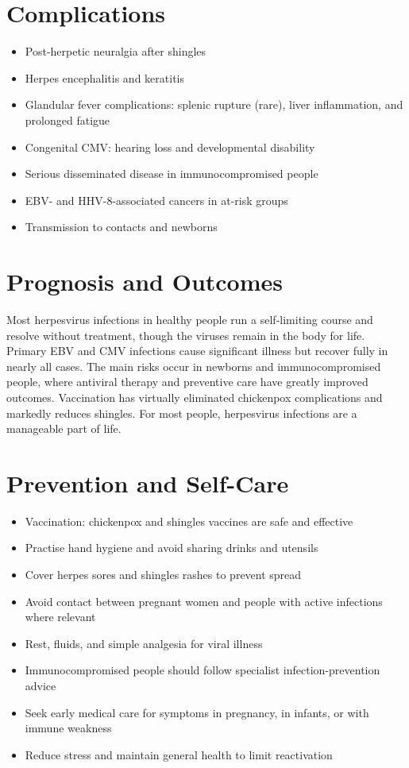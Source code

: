\section*{Complications}
\begin{itemize}
    \item Post-herpetic neuralgia after shingles
    \item Herpes encephalitis and keratitis
    \item Glandular fever complications: splenic rupture (rare), liver inflammation, and prolonged fatigue
    \item Congenital CMV: hearing loss and developmental disability
    \item Serious disseminated disease in immunocompromised people
    \item EBV- and HHV-8-associated cancers in at-risk groups
    \item Transmission to contacts and newborns
\end{itemize}

\section*{Prognosis and Outcomes}
Most herpesvirus infections in healthy people run a self-limiting course and resolve without treatment, though the viruses remain in the body for life. Primary EBV and CMV infections cause significant illness but recover fully in nearly all cases. The main risks occur in newborns and immunocompromised people, where antiviral therapy and preventive care have greatly improved outcomes. Vaccination has virtually eliminated chickenpox complications and markedly reduces shingles. For most people, herpesvirus infections are a manageable part of life.

\section*{Prevention and Self-Care}
\begin{itemize}
    \item Vaccination: chickenpox and shingles vaccines are safe and effective
    \item Practise hand hygiene and avoid sharing drinks and utensils
    \item Cover herpes sores and shingles rashes to prevent spread
    \item Avoid contact between pregnant women and people with active infections where relevant
    \item Rest, fluids, and simple analgesia for viral illness
    \item Immunocompromised people should follow specialist infection-prevention advice
    \item Seek early medical care for symptoms in pregnancy, in infants, or with immune weakness
    \item Reduce stress and maintain general health to limit reactivation
\end{itemize}

